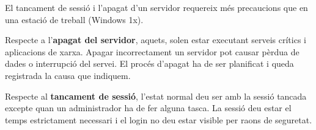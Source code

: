 \documentclass[
  a4paper,
]{article}
\begin{document}
El tancament de sessió i l'apagat d'un servidor requereix més
precaucions que en una estació de treball (Windows 1x).

Respecte a l'\textbf{apagat del servidor}, aquets, solen estar executant
serveis crítics i aplicacions de xarxa. Apagar incorrectament un
servidor pot causar pèrdua de dades o interrupció del servei. El procés
d'apagat ha de ser planificat i queda registrada la causa que indiquem.

Respecte al \textbf{tancament de sessió}, l'estat normal deu ser amb la
sessió tancada excepte quan un administrador ha de fer alguna tasca. La
sessió deu estar el temps estrictament necessari i el login no deu estar
visible per raons de seguretat.
\end{document}
